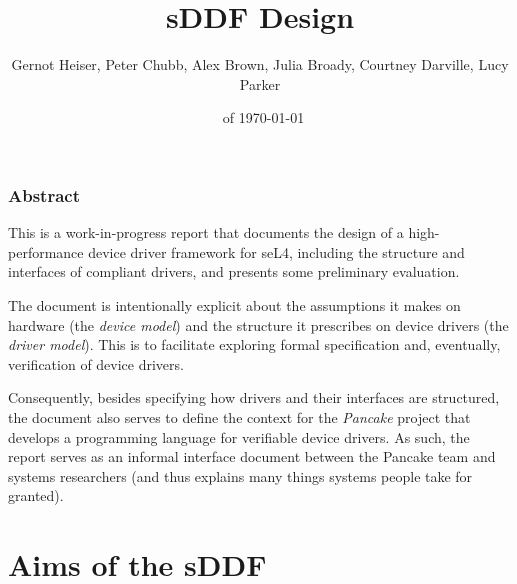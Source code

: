 \documentclass[a4paper,12pt]{report}
\renewcommand{\lstlistoflistings}{\begingroup
    \tocfile{List of Listings}{lol}
\endgroup}
\begin{document}
\newcommand{\lstnumberautorefname}{Line}
\renewcommand{\chapterautorefname}{Chapter}
\renewcommand{\sectionautorefname}{Section}
\renewcommand{\subsectionautorefname}{Section}
\renewcommand{\subsubsectionautorefname}{Section}
\renewcommand{\appendixautorefname}{Appendix}
\renewcommand{\Hfootnoteautorefname}{Footnote}

\setcounter{topnumber}{2}
\renewcommand{\topfraction}{0.91}


\title{sDDF Design}
\author{Gernot Heiser, Peter Chubb, Alex Brown, Julia Broady, Courtney Darville, Lucy Parker}
\date{\Release \ifDraft\ of \today\fi}
\maketitle

\subsection*{Abstract}

This is a work-in-progress report that documents the design of a
high-performance device driver framework for seL4, including the
structure and interfaces of compliant drivers, and presents some
preliminary evaluation.

The document is intentionally explicit about the assumptions it makes on
hardware (the \emph{device model}) and the structure it prescribes on
device drivers (the \emph{driver model}). This is to
facilitate exploring formal specification and, eventually,
verification of device drivers.

Consequently, besides specifying how drivers and their interfaces are
structured, the document also serves to define the context for the
\emph{Pancake} project that develops a programming language for
verifiable device drivers. As such, the report serves as an informal
interface document between the Pancake team and systems researchers
(and thus explains many things systems people take for granted).

\tableofcontents
\listoffigures
\lstlistoflistings
\printnoidxglossaries

\chapter{Aims of the sDDF}\label{s:aims}
\end{document}
